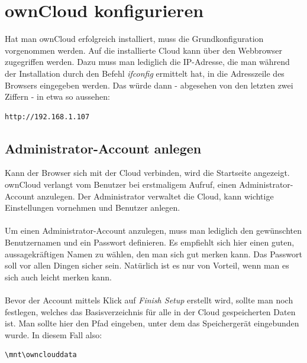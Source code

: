 \section{ownCloud konfigurieren}
Hat man ownCloud erfolgreich installiert, muss die Grundkonfiguration vorgenommen werden. Auf die installierte Cloud kann über den Webbrowser zugegriffen werden. Dazu muss man lediglich die IP-Adresse, die man während der Installation durch den Befehl \textit{ifconfig} ermittelt hat, in die Adresszeile des Browsers eingegeben werden. Das würde dann - abgesehen von den letzten zwei Ziffern - in etwa so aussehen: 

\begin{lstlisting}
http://192.168.1.107
\end{lstlisting}

\subsection{Administrator-Account anlegen}
Kann der Browser sich mit der Cloud verbinden, wird die Startseite angezeigt. ownCloud verlangt vom Benutzer bei erstmaligem Aufruf, einen Administrator-Account anzulegen. Der Administrator verwaltet die Cloud, kann wichtige Einstellungen vornehmen und Benutzer anlegen.
\\
\\
Um einen Administrator-Account anzulegen, muss man lediglich den gewünschten Benutzernamen und ein Passwort definieren. Es empfiehlt sich hier einen guten, aussagekräftigen Namen zu wählen, den man sich gut merken kann. Das Passwort soll vor allen Dingen sicher sein. Natürlich ist es nur von Vorteil, wenn man es sich auch leicht merken kann. 
\\
\\
Bevor der Account mittels Klick auf \textit{Finish Setup} erstellt wird, sollte man noch festlegen, welches das Basisverzeichnis für alle in der Cloud gespeicherten Daten ist. Man sollte hier den Pfad eingeben, unter dem das Speichergerät eingebunden wurde. In diesem Fall also:

\begin{lstlisting}
\mnt\ownclouddata
\end{lstlisting}

